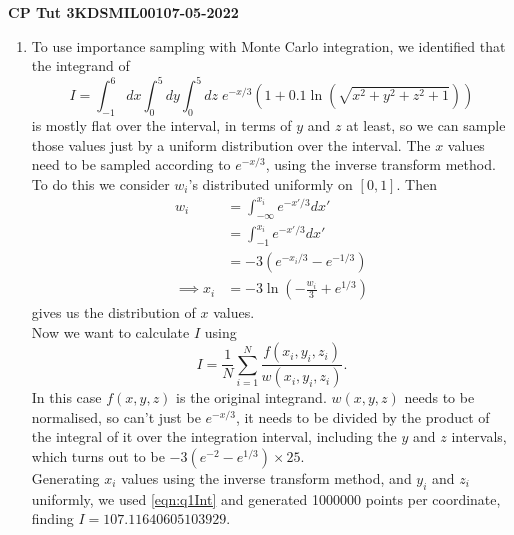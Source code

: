 \documentclass[11pt]{article}
\begin{document}
\begin{center}
    \textbf{CP Tut 3}\hspace{2in}\textbf{KDSMIL001}\hspace{2in}\textbf{07-05-2022}
\end{center}

\begin{enumerate}
    \item To use importance sampling with Monte Carlo integration, we identified that the integrand of 
    \begin{equation}
        I=\int_{-1}^6 dx \int_0^5 dy \int_0^5 dz \; e^{-x/3} \left(1+0.1\ln(\sqrt{x^2+y^2+z^2+1})\right)
    \end{equation}
    is mostly flat over the interval, in terms of $y$ and $z$ at least, so we can sample those values just by a uniform distribution over the interval. The $x$ values need to be sampled according to $e^{-x/3}$, using the inverse transform method. To do this we consider $w_i$'s distributed uniformly on $[0,1]$. Then
    \begin{align*}
        w_i&=\int_{-\infty}^{x_i}e^{-x'/3}dx'\\
        &=\int_{-1}^{x_i}e^{-x'/3}dx'\\
        &=-3(e^{-x_i/3}-e^{-1/3})\\
        \implies x_i&=-3\ln\left(-\frac{w_i}{3}+e^{1/3}\right)
    \end{align*}
    gives us the distribution of $x$ values.\\
    Now we want to calculate $I$ using 
    \begin{equation}
        I=\frac{1}{N}\sum_{i=1}^N \frac{f(x_i, y_i, z_i)}{w(x_i, y_i, z_i)}.
        \label{eqn:q1Int}
    \end{equation}
    In this case $f(x,y,z)$ is the original integrand. $w(x,y,z)$ needs to be normalised, so can't just be $e^{-x/3}$, it needs to be divided by the product of the integral of it over the integration interval, including the $y$ and $z$ intervals, which turns out to be $-3(e^{-2}-e^{1/3})\times 25$.\\
    Generating $x_i$ values using the inverse transform method, and $y_i$ and $z_i$ uniformly, we used \cref{eqn:q1Int} and generated \num[]{1000000} points per coordinate, finding $I=107.11640605103929$.
\end{enumerate}
\end{document}
